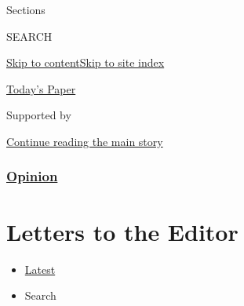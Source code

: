 Sections

SEARCH

\protect\hyperlink{site-content}{Skip to
content}\protect\hyperlink{site-index}{Skip to site index}

\href{https://myaccount.nytimes3xbfgragh.onion/auth/login?response_type=cookie\&client_id=vi}{}

\href{https://www.nytimes3xbfgragh.onion/section/todayspaper}{Today's
Paper}

Supported by

\protect\hyperlink{after-sponsor}{Continue reading the main story}

\hypertarget{opinion}{%
\subsubsection{\texorpdfstring{\href{/section/opinion}{Opinion}}{Opinion}}\label{opinion}}

\hypertarget{letters-to-the-editor}{%
\section{Letters to the Editor}\label{letters-to-the-editor}}

\begin{itemize}
\tightlist
\item
  \protect\hyperlink{stream-panel}{Latest}
\item
  Search
\end{itemize}

